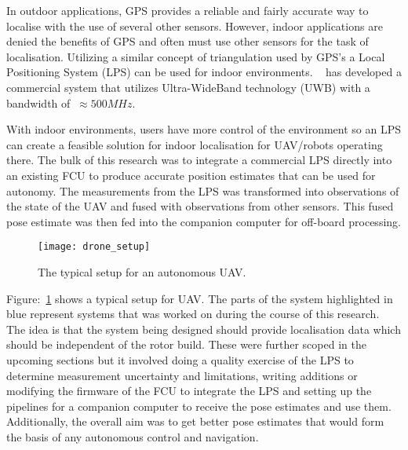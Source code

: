 In outdoor applications, GPS provides a reliable and fairly accurate way to localise with the use of several other sensors.
    However, indoor applications are denied the benefits of GPS and often must use other sensors for the task of localisation.
    Utilizing a similar concept of triangulation used by GPS's a Local Positioning System (LPS) can be used for indoor environments.
    ~\citep{pozyx2018pozyx} has developed a commercial system that utilizes Ultra-WideBand technology (UWB) with a bandwidth of $~\approx 500MHz$.

With indoor environments, users have more control of the environment so an LPS can create a feasible solution for indoor localisation for UAV/robots operating there.
    The bulk of this research was to integrate a commercial LPS directly into an existing FCU to produce accurate position estimates that can be used for autonomy.
    The measurements from the LPS was transformed into observations of the state of the UAV and fused with observations from other sensors.
    This fused pose estimate was then fed into the companion computer for off-board processing.
    \begin{figure}[h!]
        \centering
        \texttt{[image: drone\_setup]}
        \caption{The typical setup for an autonomous UAV.}
        \label{fig:ds}
    \end{figure}

    Figure:~\ref{fig:ds} shows a typical setup for UAV.
    The parts of the system highlighted in blue represent systems that was worked on during the course of this research.
    The idea is that the system being designed should provide localisation data which should be independent of the rotor build.
    These were further scoped in the upcoming sections but it involved doing a quality exercise of the LPS to determine measurement uncertainty and limitations,
    writing additions or modifying the firmware of the FCU to integrate the LPS and setting up the pipelines for a companion computer to receive the pose estimates and use them.
    Additionally, the overall aim was to get better pose estimates that would form the basis of any autonomous control and navigation.



